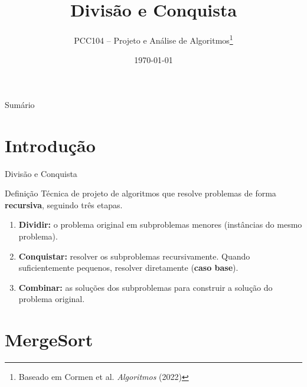 \documentclass[aspectratio=169]{beamer}
\title{Divisão e Conquista}
\author{PCC104 -- Projeto e Análise de Algoritmos\footnote{Baseado em Cormen et al. \textit{Algoritmos} (2022)}}
\date{\today}
\newcommand{\impt}[1]{\textcolor{maccent}{\textbf{#1}}}
\begin{document}
\nocite{cormen2022algoritmos}

\begin{frame}[plain]\titlepage\end{frame}

\begin{frame}{Sumário}
\tableofcontents
\end{frame}

\section{Introdução}

\begin{frame}{Divisão e Conquista}
\begin{block}{Definição}
Técnica de projeto de algoritmos que resolve problemas de forma \impt{recursiva}, seguindo três etapas.
\end{block}

\vspace{0.3cm}

\begin{enumerate}
    \item \textbf{Dividir:} o problema original em subproblemas menores (instâncias do mesmo problema).
    \pause
    \item \textbf{Conquistar:} resolver os subproblemas recursivamente. Quando suficientemente pequenos, resolver diretamente (\impt{caso base}).
    \pause
    \item \textbf{Combinar:} as soluções dos subproblemas para construir a solução do problema original.
\end{enumerate}
\end{frame}

\section{MergeSort}
\end{document}

